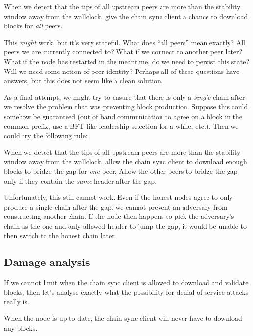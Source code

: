 \begin{failedattempt}
When we detect that the tips of all upstream peers are more than the stability
window away from the wallclock, give the chain sync client a chance to download
blocks for \emph{all} peers.
\end{failedattempt}

This \emph{might} work, but it's very stateful. What does ``all peers'' mean
exactly? All peers we are currently connected to? What if we connect to another
peer later? What if the node has restarted in the meantime, do we need to
persist this state? Will we need some notion of peer identity? Perhaps all of
these questions have answers, but this does not seem like a clean solution.

As a final attempt, we might try to ensure that there is only a \emph{single}
chain after we resolve the problem that was preventing block production.
Suppose this could somehow be guaranteed (out of band communication to agree on
a block in the common prefix, use a BFT-like leadership selection for a while,
etc.). Then we could try the following rule:

\begin{failedattempt}
When we detect that the tips of all upstream peers are more than the stability
window away from the wallclock, allow the chain sync client to download enough
blocks to bridge the gap for \emph{one} peer. Allow the other peers to bridge
the gap only if they contain the \emph{same} header after the gap.
\end{failedattempt}

Unfortunately, this still cannot work. Even if the honest nodes agree to only
produce a single chain after the gap, we cannot prevent an adversary from
constructing another chain. If the node then happens to pick the adversary's
chain as the one-and-only allowed header to jump the gap, it would be unable to
then switch to the honest chain later.

\pagebreak

\subsection{Damage analysis}

If we cannot limit when the chain sync client is allowed to download and
validate blocks, then let's analyse exactly what the possibility for denial of
service attacks really is.

\begin{lemma}
When the node is up to date, the chain sync client will never have to download
any blocks.
\end{lemma}

